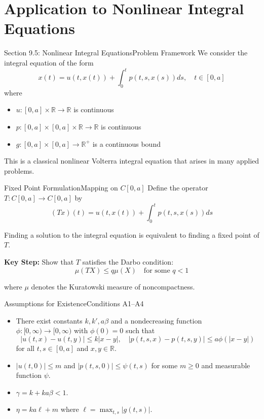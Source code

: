 \documentclass[aspectratio=169,10pt]{beamer}
\begin{document}
\section{Application to Nonlinear Integral Equations}

\begin{frame}{Section 9.5: Nonlinear Integral Equations}{Problem Framework}
We consider the integral equation of the form
\[
x(t) = u(t, x(t)) + \int_0^t p(t, s, x(s)) ds, \quad t \in [0, a]
\]
where
\begin{itemize}
    \item $u : [0, a] \times \mathbb{R} \to \mathbb{R}$ is continuous
    \item $p : [0, a] \times [0, a] \times \mathbb{R} \to \mathbb{R}$ is continuous
    \item $g : [0, a] \times [0, a] \to \mathbb{R}^+$ is a continuous bound
\end{itemize}

\medskip

This is a classical nonlinear Volterra integral equation that arises in many applied problems.
\end{frame}

\begin{frame}{Fixed Point Formulation}{Mapping on $C[0,a]$}
Define the operator $T : C[0, a] \to C[0, a]$ by
\[
(Tx)(t) = u(t, x(t)) + \int_0^t p(t, s, x(s)) ds
\]

Finding a solution to the integral equation is equivalent to finding a fixed point of $T$.

\medskip

\textbf{Key Step:} Show that $T$ satisfies the \alert{Darbo condition}:
\[
\mu(TX) \leq q \mu(X) \quad \text{for some } q < 1
\]

where $\mu$ denotes the Kuratowski measure of noncompactness.
\end{frame}

\begin{frame}{Assumptions for Existence}{Conditions A1--A4}
\begin{itemize}
    \item[\textbf{A1:}] There exist constants $k, k', a \beta$ and a nondecreasing function $\phi : [0, \infty) \to [0, \infty)$ with $\phi(0) = 0$ such that
    \[
    |u(t, x) - u(t, y)| \leq k|x - y|, \quad |p(t, s, x) - p(t, s, y)| \leq a\phi(|x - y|)
    \]
    for all $t, s \in [0, a]$ and $x, y \in \mathbb{R}$.

    \vspace{0.2cm}
    \item[\textbf{A2:}] $|u(t, 0)| \leq m$ and $|p(t, s, 0)| \leq \psi(t, s)$ for some $m \geq 0$ and measurable function $\psi$.

    \vspace{0.2cm}
    \item[\textbf{A3:}] $\gamma = k + ka\beta < 1$.

    \vspace{0.2cm}
    \item[\textbf{A4:}] $\eta = ka\ell + m$ where $\ell = \max_{t,s} |g(t,s)|$.
\end{itemize}
\end{frame}
\end{document}
